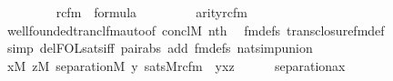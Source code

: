 \begin{isabellebody}
\ \ \ \ \isanewline
\ \ \ \ {\isachardoublequoteopen}rcfm{\isacharparenleft}{\kern0pt}{}{\isacharcomma}{\kern0pt}{}{\isacharcomma}{\kern0pt}{}{\isacharparenright}{\kern0pt}\ {\isasymin}\ formula{\isachardoublequoteclose}\isanewline
\ \ \ \ \isanewline
\ \ \ \ {\isachardoublequoteopen}arity{\isacharparenleft}{\kern0pt}rcfm{\isacharparenleft}{\kern0pt}{}{\isacharcomma}{\kern0pt}{}{\isacharcomma}{\kern0pt}{}{\isacharparenright}{\kern0pt}{\isacharparenright}{\kern0pt}\ {\isacharequal}{\kern0pt}\ {}{\isachardoublequoteclose}\isanewline
\ \ \ \ \isamarkupfalse%
\ wellfounded{\isacharunderscore}{\kern0pt}trancl{\isacharunderscore}{\kern0pt}fm{\isacharunderscore}{\kern0pt}auto{\isacharbrackleft}{\kern0pt}of\ concl{\isacharcolon}{\kern0pt}M\ {\isachardoublequoteopen}nth{\isacharparenleft}{\kern0pt}{}{\isacharcomma}{\kern0pt}{\isacharunderscore}{\kern0pt}{\isacharparenright}{\kern0pt}{\isachardoublequoteclose}{\isacharbrackright}{\kern0pt}\ \isamarkupfalse%
\ fm{\isacharunderscore}{\kern0pt}defs\ trans{\isacharunderscore}{\kern0pt}closure{\isacharunderscore}{\kern0pt}fm{\isacharunderscore}{\kern0pt}def\isanewline
\ \ \ \ \isamarkupfalse%
\ {\isacharparenleft}{\kern0pt}simp\ del{\isacharcolon}{\kern0pt}FOL{\isacharunderscore}{\kern0pt}sats{\isacharunderscore}{\kern0pt}iff\ pair{\isacharunderscore}{\kern0pt}abs\ add{\isacharcolon}{\kern0pt}\ fm{\isacharunderscore}{\kern0pt}defs\ nat{\isacharunderscore}{\kern0pt}simp{\isacharunderscore}{\kern0pt}union{\isacharparenright}{\kern0pt}\isanewline
\ \ \isamarkupfalse%
\isanewline
\ \ \isamarkupfalse%
\ {\isachardoublequoteopen}{\isasymforall}x{\isasymin}M{\isachardot}{\kern0pt}\ {\isasymforall}z{\isasymin}M{\isachardot}{\kern0pt}\ separation{\isacharparenleft}{\kern0pt}{\isacharhash}{\kern0pt}{\isacharhash}{\kern0pt}M{\isacharcomma}{\kern0pt}\ {\isasymlambda}y{\isachardot}{\kern0pt}\ sats{\isacharparenleft}{\kern0pt}M{\isacharcomma}{\kern0pt}rcfm{\isacharparenleft}{\kern0pt}{}{\isacharcomma}{\kern0pt}{}{\isacharcomma}{\kern0pt}{}{\isacharparenright}{\kern0pt}\ {\isacharcomma}{\kern0pt}\ {\isacharbrackleft}{\kern0pt}y{\isacharcomma}{\kern0pt}x{\isacharcomma}{\kern0pt}z{\isacharbrackright}{\kern0pt}{\isacharparenright}{\kern0pt}{\isacharparenright}{\kern0pt}{\isachardoublequoteclose}\isanewline
\ \ \ \ \isamarkupfalse%
\ separation{\isacharunderscore}{\kern0pt}ax\ \isamarkupfalse%

\end{isabellebody}
